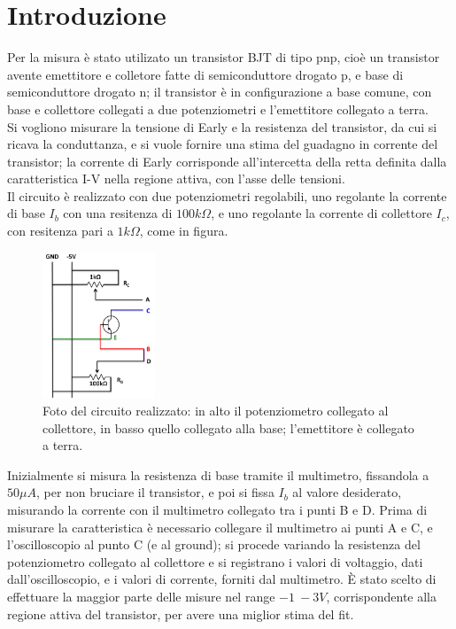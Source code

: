 \documentclass{article}
\begin{document}
\section{Introduzione}
Per la misura è stato utilizato un transistor BJT di tipo pnp, cioè un transistor avente emettitore e colletore fatte di semiconduttore drogato p, e base di semiconduttore drogato n; il transistor è in configurazione a base comune, con base
e collettore collegati a due potenziometri e l'emettitore collegato a terra.\\
Si vogliono misurare la tensione di Early e la resistenza del transistor, da cui si ricava la conduttanza, e si vuole fornire una stima del guadagno in corrente del transistor;
la corrente di Early corrisponde all'intercetta della retta definita dalla caratteristica I-V nella regione attiva, con l'asse delle tensioni.\\
Il circuito è realizzato con due potenziometri regolabili, uno regolante la corrente di base $I_b$ con una resitenza di $100k\Omega$, e uno regolante
la corrente di collettore $I_c$, con resitenza pari a $1k\Omega$, come in figura.
\begin{figure}[H]
    \centering
    \includegraphics[width=0.3\textwidth]{circuito.jpg}
    \caption{\centering\label{fig:circuito}Foto del circuito realizzato: in alto il potenziometro collegato al collettore, in basso quello collegato alla base; l'emettitore è collegato a terra.}
\end{figure}
Inizialmente si misura la resistenza di base tramite il multimetro, fissandola a $50 \mu A$, per non bruciare il transistor, e poi si fissa $I_b$ al valore desiderato, misurando la corrente con il multimetro collegato tra i punti B e D.
Prima di misurare la caratteristica è necessario collegare il multimetro ai punti A e C, e l'oscilloscopio al punto C (e al ground); si procede variando la resistenza del potenziometro collegato al collettore e si registrano i valori di voltaggio, dati dall'oscilloscopio, e i valori di corrente, forniti dal multimetro.
È stato scelto di effettuare la maggior parte delle misure nel range $-1~-3 V$, corrispondente alla regione attiva del transistor, per avere una miglior stima del fit.
\end{document}
